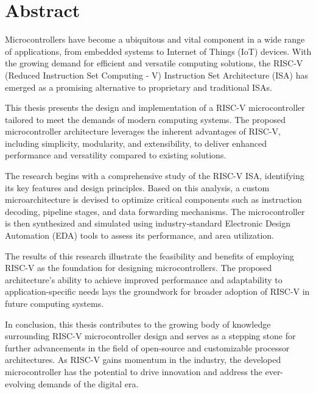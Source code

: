 {
\newpage
\vspace*{\fill}
{
	\centering
	\section*{Abstract}
}
Microcontrollers have become a ubiquitous and vital component in a wide range of applications, from embedded systems to Internet of Things (IoT) devices.
With the growing demand for efficient and versatile computing solutions, the RISC-V (Reduced Instruction Set Computing - V) Instruction Set Architecture (ISA) has emerged as
a promising alternative to proprietary and traditional ISAs.


This thesis presents the design and implementation of a RISC-V microcontroller tailored to meet the demands of modern computing systems.
The proposed microcontroller architecture leverages the inherent advantages of RISC-V, including simplicity, modularity, and extensibility,
to deliver enhanced performance and versatility compared to existing solutions.


The research begins with a comprehensive study of the RISC-V ISA, identifying its key features and design principles.
Based on this analysis, a custom microarchitecture is devised to optimize critical components such as instruction decoding, pipeline stages, and data forwarding mechanisms.
The microcontroller is then synthesized and simulated using industry-standard Electronic Design Automation (EDA) tools to assess its performance, and area utilization.


The results of this research illustrate the feasibility and benefits of employing RISC-V as the foundation for designing microcontrollers.
The proposed architecture's ability to achieve improved performance and adaptability to application-specific
needs lays the groundwork for broader adoption of RISC-V in future computing systems.


In conclusion, this thesis contributes to the growing body of knowledge surrounding RISC-V microcontroller design and serves as a stepping stone for
further advancements in the field of open-source and customizable processor architectures. As RISC-V gains momentum in the industry,
the developed microcontroller has the potential to drive innovation and address the ever-evolving demands of the digital era.
\vspace*{\fill}
}
